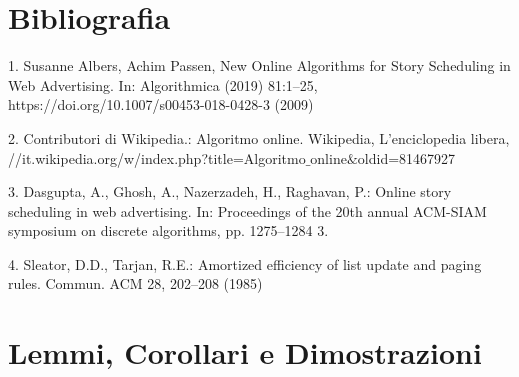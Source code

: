 \documentclass[12pt]{article}
\begin{document}
\section{Bibliografia}
1. Susanne Albers, Achim Passen, New Online Algorithms for Story Scheduling
in Web Advertising. In: Algorithmica (2019) 81:1–25, https://doi.org/10.1007/s00453-018-0428-3
(2009)
\begin{flushleft}
2. Contributori di Wikipedia.: Algoritmo online. Wikipedia, L'enciclopedia libera, //it.wikipedia.org/w/index.php?title=Algoritmo$\_$online$\&$oldid=81467927
\end{flushleft}
\begin{flushleft}
3. Dasgupta, A., Ghosh, A., Nazerzadeh, H., Raghavan, P.: Online story scheduling in web advertising.
In: Proceedings of the 20th annual ACM-SIAM symposium on discrete algorithms, pp. 1275–1284
3. 
\end{flushleft}
4. Sleator, D.D., Tarjan, R.E.: Amortized efficiency of list update and paging rules. Commun. ACM 28,
202–208 (1985)
\appendix
\section{Lemmi, Corollari e Dimostrazioni}
\end{document}
